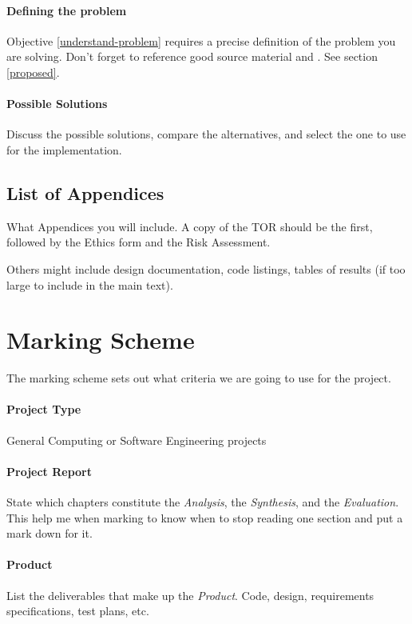 \paragraph{Defining the problem}  Objective \ref{understand-problem} requires a precise definition of the problem you are solving.  Don't forget to reference good source material \citep{henning_schulzrinne} and \citep{talbot2013}.  See section \ref{proposed}.

\paragraph{Possible Solutions} Discuss the possible solutions, compare the
alternatives, and select the one to use for the  implementation.

\subsection*{List of Appendices}
What Appendices you will include.  A copy of the TOR should be the first, followed by the Ethics form and the Risk Assessment.

Others might include design documentation, code listings, tables of results (if too large to include in the main text).

\section*{Marking Scheme}
The marking scheme sets out what criteria we are going to use for the project.

\paragraph{Project Type} General Computing or Software Engineering projects

\paragraph{Project Report}  State which chapters constitute the \emph{Analysis}, the \emph{Synthesis}, and the \emph{Evaluation}.  This help me when marking to know when to stop reading one section and put a mark down for it.

\paragraph{Product}  List the deliverables that make up the \emph{Product}.  Code, design, requirements specifications, test plans, etc.

